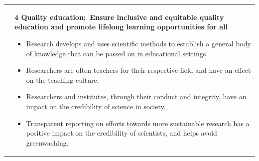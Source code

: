 \documentclass[../SustainableHEP.tex]{subfiles}
\begin{document}
\begin{longtable*}{l l}
\parbox[t]{\SDGleft\textwidth}{} & \parbox[t]{\SDGright\textwidth}{\textbf{4 Quality education:\ Ensure inclusive and equitable quality education and promote lifelong learning opportunities for all}
\vspace{\recskip}
\begin{itemize}[leftmargin=20pt]
\setlength{\itemsep}{\recskip}
\item Research develops and uses scientific methods to establish a general body of knowledge that can be passed on in educational settings.
\item Researchers are often teachers for their respective field and have an effect on the teaching culture.
\item Researchers and institutes, through their conduct and integrity, have an impact on the credibility of science in society.
\item Transparent reporting on efforts towards more sustainable research has a positive impact on the credibility of scientists, and helps avoid greenwashing.
\end{itemize}}\\


\end{longtable*}
\end{document}
